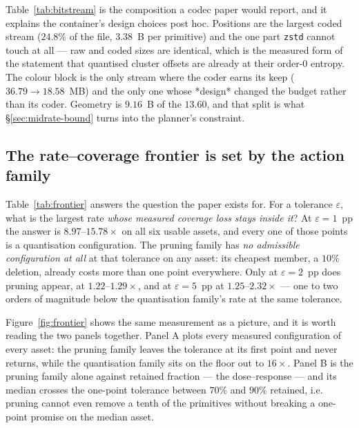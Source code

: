 \documentclass[preprint,number,3p]{elsarticle}
\begin{document}


Table~\ref{tab:bitstream} is the composition a codec paper would report, and it explains the container's design
choices post hoc. Positions are the largest coded stream ($24.8\%$ of the file, $3.38$~B per primitive) and the one
part \texttt{zstd} cannot touch at all --- raw and coded sizes are identical, which is the measured form of the
statement that quantised cluster offsets are already at their order-0 entropy. The colour block is the only stream
where the coder earns its keep ($36.79 \to 18.58$~MB) and the only one whose *design* changed the budget rather than
its coder. Geometry is $9.16$~B of the $13.60$, and that split is what \S\ref{sec:midrate-bound} turns into the
planner's constraint.



\subsection{The rate--coverage frontier is set by the action family}
\label{sec:frontier}

Table~\ref{tab:frontier} answers the question the paper exists for. For a tolerance $\varepsilon$, what is the largest
rate \emph{whose measured coverage loss stays inside it}? At $\varepsilon = 1$~pp the answer is
$8.97$--$15.78\times$ on all six usable assets, and every one of those points is a quantisation configuration. The
pruning family has \emph{no admissible configuration at all} at that tolerance on any asset: its cheapest member, a
$10\%$ deletion, already costs more than one point everywhere. Only at $\varepsilon = 2$~pp does pruning appear, at
$1.22$--$1.29\times$, and at $\varepsilon = 5$~pp at $1.25$--$2.32\times$ --- one to two orders of magnitude below
the quantisation family's rate at the same tolerance.



Figure~\ref{fig:frontier} shows the same measurement as a picture, and it is worth reading the two panels
together. Panel A plots every measured configuration of every asset: the pruning family leaves the tolerance at its
first point and never returns, while the quantisation family sits on the floor out to $16\times$. Panel B is the
pruning family alone against retained fraction --- the dose--response --- and its median crosses the one-point
tolerance between $70\%$ and $90\%$ retained, i.e. pruning cannot even remove a tenth of the primitives without
breaking a one-point promise on the median asset.
\end{document}
